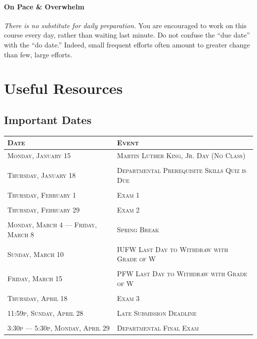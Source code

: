 \documentclass[letterpaper,twoside]{article}
\begin{document}
\begin{multicols*}{2}

    \paragraph{On Pace \& Overwhelm}
    \textit{There is no substitute for daily preparation.}
    You are encouraged to work on this course every day, rather than waiting last minute.
    Do not confuse the ``due date'' with the ``do date.''
    Indeed, small frequent efforts often amount to greater change than few, large efforts.

\end{multicols*}
    \section*{Useful Resources}

    \subsection*{Important Dates}
    \begin{center}
        \onehalfspacing
        \begin{tabularx}{\columnwidth}{ll}
            \textsc{Date} & \textsc{Event}\\
            \hline
            \textsc{Monday, January 15} & \textsc{Martin Luther King, Jr. Day (No Class)}\\
            \\
            \textsc{Thursday, January 18} & \textsc{Departmental Prerequisite Skills Quiz is Due}\\
            \\
            \textsc{Thursday, February 1} & \textsc{Exam 1}\\
            \\
            \textsc{Thursday, February 29} & \textsc{Exam 2}\\
            \\
            \textsc{Monday, March 4 --- Friday, March 8} & \textsc{Spring Break}\\
            \\
            \textsc{Sunday, March 10} & \textsc{IUFW Last Day to Withdraw with Grade of W}\\
            \\
            \textsc{Friday, March 15} & \textsc{PFW Last Day to Withdraw with Grade of W}\\
            \\
            \textsc{Thursday, April 18} & \textsc{Exam 3}\\
            \\
            \textsc{11:59p, Sunday, April 28} & \textsc{Late Submission Deadline}\\
            \\
            \textsc{3:30p --- 5:30p, Monday, April 29} & \textsc{Departmental Final Exam}\\
        \end{tabularx}
    \end{center}
\end{document}
